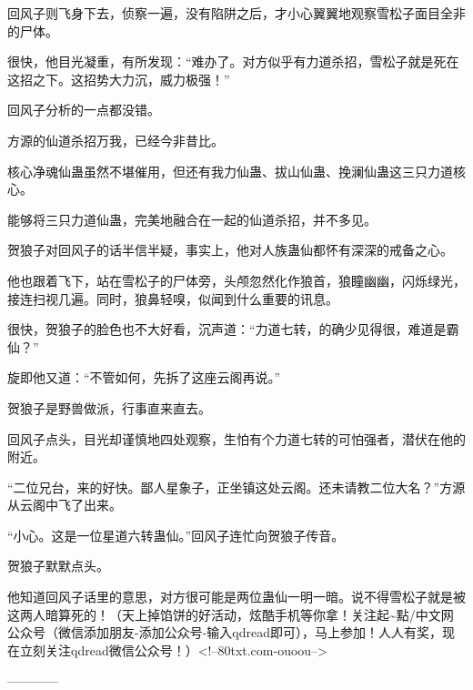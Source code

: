 \begin{this_body}
回风子则飞身下去，侦察一遍，没有陷阱之后，才小心翼翼地观察雪松子面目全非的尸体。

很快，他目光凝重，有所发现：“难办了。对方似乎有力道杀招，雪松子就是死在这招之下。这招势大力沉，威力极强！”

回风子分析的一点都没错。

方源的仙道杀招万我，已经今非昔比。

核心净魂仙蛊虽然不堪催用，但还有我力仙蛊、拔山仙蛊、挽澜仙蛊这三只力道核心。

能够将三只力道仙蛊，完美地融合在一起的仙道杀招，并不多见。

贺狼子对回风子的话半信半疑，事实上，他对人族蛊仙都怀有深深的戒备之心。

他也跟着飞下，站在雪松子的尸体旁，头颅忽然化作狼首，狼瞳幽幽，闪烁绿光，接连扫视几遍。同时，狼鼻轻嗅，似闻到什么重要的讯息。

很快，贺狼子的脸色也不大好看，沉声道：“力道七转，的确少见得很，难道是霸仙？”

旋即他又道：“不管如何，先拆了这座云阁再说。”

贺狼子是野兽做派，行事直来直去。

回风子点头，目光却谨慎地四处观察，生怕有个力道七转的可怕强者，潜伏在他的附近。

“二位兄台，来的好快。鄙人星象子，正坐镇这处云阁。还未请教二位大名？”方源从云阁中飞了出来。

“小心。这是一位星道六转蛊仙。”回风子连忙向贺狼子传音。

贺狼子默默点头。

他知道回风子话里的意思，对方很可能是两位蛊仙一明一暗。说不得雪松子就是被这两人暗算死的！（天上掉馅饼的好活动，炫酷手机等你拿！关注起\~{}點/中文网公众号（微信添加朋友-添加公众号-输入qdread即可），马上参加！人人有奖，现在立刻关注qdread微信公众号！）<!--80txt.com-ouoou-->

------------

\end{this_body}

